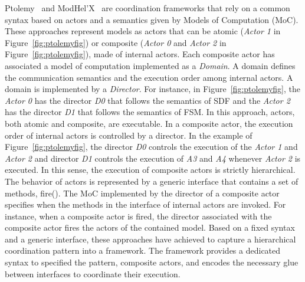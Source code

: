 Ptolemy~\cite{ptoleframebib} and ModHel'X~\cite{modhelxbib} are coordination frameworks that rely on a common syntax based on actors and a semantics given by Models of Computation (MoC). These approaches represent models as actors that can be atomic (\eg \emph{Actor 1} in Figure~\ref{fig:ptolemyfig}) or composite (\eg \emph{Actor 0} and \emph{Actor 2} in Figure~\ref{fig:ptolemyfig}), \ie made of internal actors. Each composite actor has associated a model of computation implemented as a \emph{Domain}. A domain defines the communication semantics and the execution order among internal actors. A domain is implemented by a \emph{Director}. For instance, in Figure~\ref{fig:ptolemyfig}, the \emph{Actor 0} has the director \emph{D0} that follows the semantics of SDF and the \emph{Actor 2} has the director \emph{D1} that follows the semantics of FSM. In this approach, actors, both atomic and composite, are executable. In a composite actor, the execution order of internal actors is controlled by a director. In the example of Figure~\ref{fig:ptolemyfig}, the director \emph{D0} controls the execution of the \emph{Actor 1} and \emph{Actor 2} and director \emph{D1} controls the execution of \emph{A3} and \emph{A4} whenever \emph{Actor 2} is executed. In this sense, the execution of composite actors is strictly hierarchical. The behavior of actors is represented by a generic interface that contains a set of methods, \eg fire(). The MoC implemented by the director of a composite actor specifies when the methods in the interface of internal actors are invoked. For instance, when a composite actor is fired, the director associated with the composite actor fires the actors of the contained model. Based on a fixed syntax and a generic interface, these approaches have achieved to capture a hierarchical coordination pattern into a framework. The framework provides a dedicated syntax to specified the pattern, \ie composite actors, and encodes the necessary glue between interfaces to coordinate their execution.     



